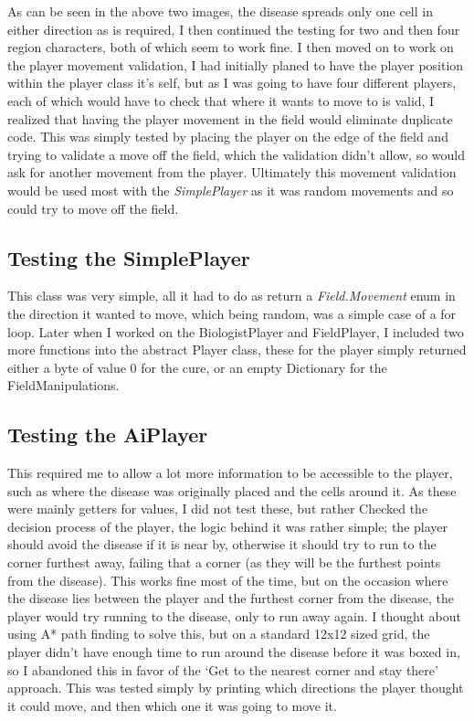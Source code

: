 \documentclass[pdftex,12pt,a4paper]{article}
\begin{document}
			As can be seen in the above two images, the disease spreads only one cell in either direction as is required, I then continued the testing for two and then four region characters, both of which seem to work fine. I then moved on to work on the player movement validation, I had initially planed to have the player position within the player class it's self, but as I was going to have four different players, each of which would have to check that where it wants to move to is valid, I realized that having the player movement in the field would eliminate duplicate code. This was simply tested by placing the player on the edge of the field and trying to validate a move off the field, which the validation didn't allow, so would ask for another movement from the player. Ultimately this movement validation would be used most with the \emph{SimplePlayer} as it was random movements and so could try to move off the field.
		\subsection{Testing the SimplePlayer}
			This class was very simple, all it had to do as return a \emph{Field.Movement} enum in the direction it wanted to move, which being random, was a simple case of a for loop. Later when I worked on the BiologistPlayer and FieldPlayer, I included two more functions into the abstract Player class, these for the player simply returned either a byte of value 0 for the cure, or an empty Dictionary for the FieldManipulations.
		\subsection{Testing the AiPlayer}
			This required me to allow a lot more information to be accessible to the player, such as where the disease was originally placed and the cells around it. As these were mainly getters for values, I did not test these, but rather Checked the decision process of the player, the logic behind it was rather simple; the player should avoid the disease if it is near by, otherwise it should try to run to the corner furthest away, failing that a corner (as they will be the furthest points from the disease). This works fine most of the time, but on the occasion where the disease lies between the player and the furthest corner from the disease, the player would try running to the disease, only to run away again. I thought about using A* path finding to solve this, but on a standard 12x12 sized grid, the player didn't have enough time to run around the disease before it was boxed in, so I abandoned this in favor of the `Get to the nearest corner and stay there' approach. This was tested simply by printing which directions the player thought it could move, and then which one it was going to move it.
\end{document}

